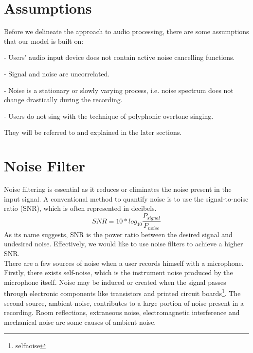 \section{Assumptions}
Before we delineate the approach to audio processing, there are some assumptions that our model
is built on:

\begin{assumption}-\label{as:1}
    Users' audio input device does not contain active noise cancelling functions.
\end{assumption}

\begin{assumption}-\label{as:2}
    Signal and noise are uncorrelated.
\end{assumption}

\begin{assumption}-\label{as:3}
    Noise is a stationary or slowly varying process, i.e. noise spectrum does not change drastically during the recording.
\end{assumption}

\begin{assumption}-\label{as:4}
    Users do not sing with the technique of polyphonic overtone singing.
\end{assumption}

    
They will be referred to and explained in the later sections.

\section{Noise Filter}
\label{sec:NF}
Noise filtering is essential as it reduces or eliminates the noise present in the input signal.
A conventional method to quantify noise is to use the signal-to-noise ratio (SNR), which is often 
represented in decibels.
\[SNR=10*log_{10}\frac{P_{signal}}{P_{noise}}\]
As its name suggests, SNR is the power ratio between the desired signal and undesired noise. Effectively,
we would like to use noise filters to achieve a higher SNR.\\ 
There are a few sources of noise when a user records himself with a microphone.
Firstly, there exists self-noise, which is the instrument noise produced by the microphone itself.
Noise may be induced or created when the signal passes through electronic components like transistors 
and printed circuit boards\footnote{selfnoise}.
The second source, ambient noise, contributes to a large portion of noise present in a recording.
Room reflections, extraneous noise, electromagnetic interference and mechanical noise are some causes 
of ambient noise.  

